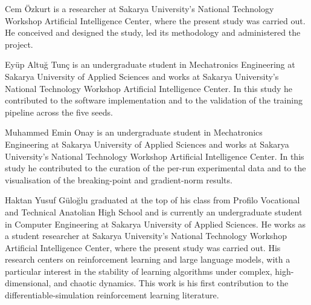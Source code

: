 \documentclass[a4paper,fleqn]{cas-dc}
\begin{document}
\printcredits




\bio{}
Cem \"Ozkurt is a researcher at Sakarya University's National Technology
Workshop Artificial Intelligence Center, where the present study was carried
out. He conceived and designed the study, led its methodology and
administered the project.
\endbio

\bio{}
Ey\"up Altu\u{g} Tun\c{c} is an undergraduate student in Mechatronics
Engineering at Sakarya University of Applied Sciences and works at Sakarya
University's National Technology Workshop Artificial Intelligence Center. In
this study he contributed to the software implementation and to the
validation of the training pipeline across the five seeds.
\endbio

\bio{}
Muhammed Emin Onay is an undergraduate student in Mechatronics Engineering at
Sakarya University of Applied Sciences and works at Sakarya University's
National Technology Workshop Artificial Intelligence Center. In this study he
contributed to the curation of the per-run experimental data and to the
visualisation of the breaking-point and gradient-norm results.
\endbio

Haktan Yusuf G\"ulo\u{g}lu graduated at the top of his class from Profilo
Vocational and Technical Anatolian High School and is currently an
undergraduate student in Computer Engineering at Sakarya University of
Applied Sciences. He works as a student researcher at Sakarya University's
National Technology Workshop Artificial Intelligence Center, where the
present study was carried out. His research centers on reinforcement
learning and large language models, with a particular interest in the
stability of learning algorithms under complex, high-dimensional, and
chaotic dynamics. This work is his first contribution to the
differentiable-simulation reinforcement learning literature.
\endbio
\end{document}
